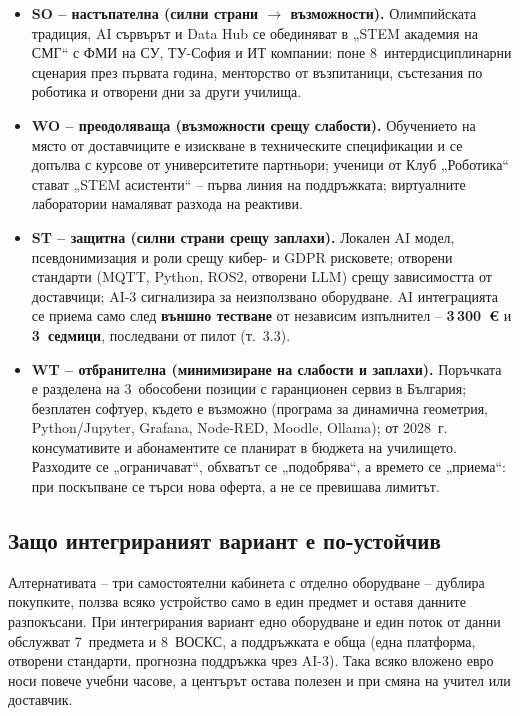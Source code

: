\documentclass[11pt,a4paper]{article}
\begin{document}
\begin{itemize}[itemsep=2pt]
  \item \textbf{SO – настъпателна (силни страни $\to$ възможности).} Олимпийската традиция, AI сървърът и Data Hub се обединяват в „STEM академия на СМГ“ с ФМИ на СУ, ТУ-София и ИТ компании: поне 8~интердисциплинарни сценария през първата година, менторство от възпитаници, състезания по роботика и отворени дни за други училища.
  \item \textbf{WO – преодоляваща (възможности срещу слабости).} Обучението на място от доставчиците е изискване в техническите спецификации и се допълва с курсове от университетите партньори; ученици от Клуб „Роботика“ стават „STEM асистенти“ – първа линия на поддръжката; виртуалните лаборатории намаляват разхода на реактиви.
  \item \textbf{ST – защитна (силни страни срещу заплахи).} Локален AI модел, псевдонимизация и роли срещу кибер- и GDPR рисковете; отворени стандарти (MQTT, Python, ROS2, отворени LLM) срещу зависимостта от доставчици; AI-3 сигнализира за неизползвано оборудване. AI интеграцията се приема само след \textbf{външно тестване} от независим изпълнител – \textbf{3\,300~€} и \textbf{3~седмици}, последвани от пилот (т.~3.3).
  \item \textbf{WT – отбранителна (минимизиране на слабости и заплахи).} Поръчката е разделена на 3~обособени позиции с гаранционен сервиз в България; безплатен софтуер, където е възможно (програма за динамична геометрия, Python/Jupyter, Grafana, Node-RED, Moodle, Ollama); от 2028~г. консумативите и абонаментите се планират в бюджета на училището. Разходите се „ограничават“, обхватът се „подобрява“, а времето се „приема“: при поскъпване се търси нова оферта, а не се превишава лимитът. 
\end{itemize}

\subsection{Защо интегрираният вариант е по-устойчив}

Алтернативата – три самостоятелни кабинета с отделно оборудване – дублира покупките, ползва всяко устройство само в един предмет и оставя данните разпокъсани. При интегрирания вариант едно оборудване и един поток от данни обслужват 7~предмета и 8~ВОСКС, а поддръжката е обща (една платформа, отворени стандарти, прогнозна поддръжка чрез AI-3). Така всяко вложено евро носи повече учебни часове, а центърът остава полезен и при смяна на учител или доставчик.
\end{document}
